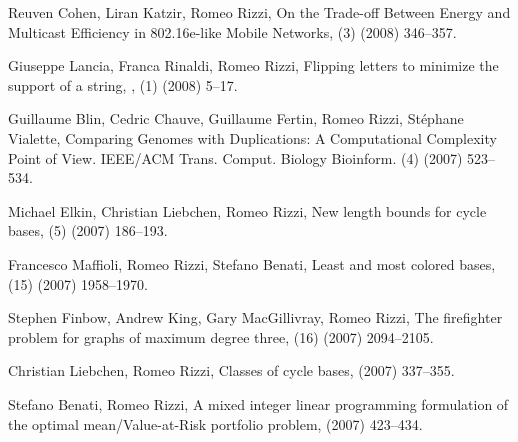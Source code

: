 \begin{etaremune}
  \item {\sc Reuven Cohen, Liran Katzir, Romeo Rizzi},
   \newblock   On the Trade-off Between Energy and Multicast Efficiency in 802.16e-like Mobile Networks,
   (3) (2008) 346--357.

  \item {\sc Giuseppe Lancia, Franca Rinaldi, Romeo Rizzi},
   \newblock  Flipping letters to minimize the support of a string,
   ,
   (1) (2008) 5--17.

  \item {\sc Guillaume Blin, Cedric Chauve, Guillaume Fertin, Romeo Rizzi, St\'ephane Vialette},
   \newblock  Comparing Genomes with Duplications: A Computational Complexity Point of View.
   \newblock  IEEE/ACM Trans. Comput. Biology Bioinform.
   (4) (2007) 523--534.

  \item {\sc Michael Elkin, Christian Liebchen, Romeo Rizzi},
   \newblock  New length bounds for cycle bases,
   (5) (2007) 186--193.

  \item {\sc Francesco Maffioli, Romeo Rizzi, Stefano Benati},
   \newblock  Least and most colored bases,
   (15) (2007) 1958--1970.

  \item {\sc Stephen Finbow, Andrew King, Gary MacGillivray, Romeo Rizzi},
   \newblock  The firefighter problem for graphs of maximum degree three,
   (16) (2007) 2094--2105.

  \item {\sc Christian Liebchen, Romeo Rizzi},
   \newblock  Classes of cycle bases,
    (2007) 337--355.

  \item {\sc Stefano Benati, Romeo Rizzi},
   \newblock  A mixed integer linear programming formulation
              of the optimal mean/Value-at-Risk portfolio problem,
    (2007) 423--434.


\end{etaremune}
